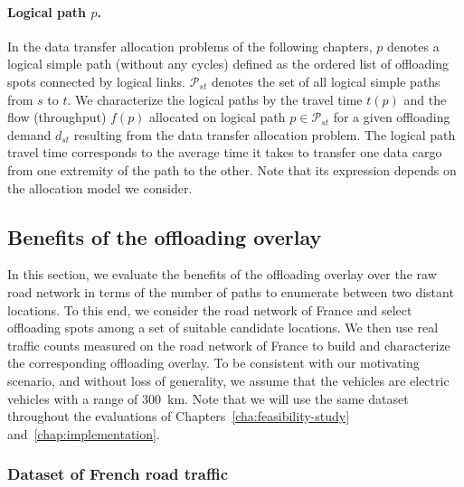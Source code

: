 \paragraph{Logical path $p$.}
In the data transfer allocation problems of the following chapters, $p$ denotes a logical simple path (\ie without any cycles) defined as the ordered list of offloading spots connected by logical links. $\mathcal{P}_{st}$ denotes the set of all logical simple paths from $s$ to $t$. We characterize the logical paths by the travel time $t(p)$ and the flow (throughput) $f(p)$ allocated on logical path $p\in\mathcal{P}_{st}$ for a given offloading demand $d_{st}$ resulting from the data transfer allocation problem. The logical path travel time corresponds to the average time it takes to transfer one data cargo from one extremity of the path to the other. Note that its expression depends on the allocation model we consider.


\subsection{Benefits of the offloading overlay}
\label{sec:benefits-offloading-overlay}

In this section, we evaluate the benefits of the offloading overlay over the raw road network in terms of the number of paths to enumerate between two distant locations. To this end, we consider the road network of France and select offloading spots among a set of suitable candidate locations. We then use real traffic counts measured on the road network of France to build and characterize the corresponding offloading overlay. To be consistent with our motivating scenario, and without loss of generality, we assume that the vehicles are electric vehicles with a range of 300~km. Note that we will use the same dataset throughout the evaluations of Chapters~\ref{cha:feasibility-study} and~\ref{chap:implementation}.

\subsubsection{Dataset of French road traffic}

